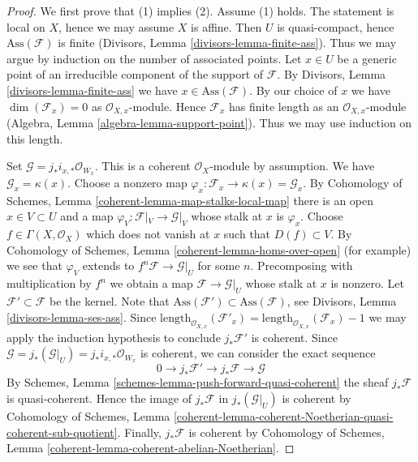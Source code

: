\begin{proof}
We first prove that (1) implies (2). Assume (1) holds.
The statement is local on $X$, hence we may assume $X$ is affine.
Then $U$ is quasi-compact, hence $\text{Ass}(\mathcal{F})$ is finite
(Divisors, Lemma \ref{divisors-lemma-finite-ass}). Thus we may argue by
induction on the number of associated points. Let $x \in U$ be a generic
point of an irreducible component of the support of $\mathcal{F}$.
By Divisors, Lemma \ref{divisors-lemma-finite-ass} we have
$x \in \text{Ass}(\mathcal{F})$. By our choice of $x$ we have
$\dim(\mathcal{F}_x) = 0$ as $\mathcal{O}_{X, x}$-module.
Hence $\mathcal{F}_x$ has finite length as an $\mathcal{O}_{X, x}$-module
(Algebra, Lemma \ref{algebra-lemma-support-point}).
Thus we may use induction on this length.

\medskip\noindent
Set $\mathcal{G} = j_*i_{x, *}\mathcal{O}_{W_x}$. This is a coherent
$\mathcal{O}_X$-module by assumption. We have $\mathcal{G}_x = \kappa(x)$.
Choose a nonzero map
$\varphi_x : \mathcal{F}_x \to \kappa(x) = \mathcal{G}_x$.
By Cohomology of Schemes, Lemma \ref{coherent-lemma-map-stalks-local-map}
there is an open $x \in V \subset U$ and a map
$\varphi_V : \mathcal{F}|_V \to \mathcal{G}|_V$ whose stalk
at $x$ is $\varphi_x$. Choose $f \in \Gamma(X, \mathcal{O}_X)$
which does not vanish at $x$ such that $D(f) \subset V$. By
Cohomology of Schemes, Lemma \ref{coherent-lemma-homs-over-open}
(for example) we see that $\varphi_V$ extends to
$f^n\mathcal{F} \to \mathcal{G}|_U$ for some $n$.
Precomposing with multiplication by $f^n$ we obtain a map
$\mathcal{F} \to \mathcal{G}|_U$ whose stalk at $x$ is nonzero.
Let $\mathcal{F}' \subset \mathcal{F}$ be the kernel.
Note that $\text{Ass}(\mathcal{F}') \subset \text{Ass}(\mathcal{F})$, see
Divisors, Lemma \ref{divisors-lemma-ses-ass}.
Since
$\text{length}_{\mathcal{O}_{X, x}}(\mathcal{F}'_x) =
\text{length}_{\mathcal{O}_{X, x}}(\mathcal{F}_x) - 1$
we may apply the
induction hypothesis to conclude $j_*\mathcal{F}'$ is coherent.
Since $\mathcal{G} = j_*(\mathcal{G}|_U) = j_*i_{x, *}\mathcal{O}_{W_x}$
is coherent, we can consider the exact sequence
$$
0 \to j_*\mathcal{F}' \to j_*\mathcal{F} \to \mathcal{G}
$$
By Schemes, Lemma \ref{schemes-lemma-push-forward-quasi-coherent}
the sheaf $j_*\mathcal{F}$ is quasi-coherent.
Hence the image of $j_*\mathcal{F}$ in $j_*(\mathcal{G}|_U)$
is coherent by Cohomology of Schemes, Lemma
\ref{coherent-lemma-coherent-Noetherian-quasi-coherent-sub-quotient}.
Finally, $j_*\mathcal{F}$ is coherent by
Cohomology of Schemes, Lemma \ref{coherent-lemma-coherent-abelian-Noetherian}.


\end{proof}
